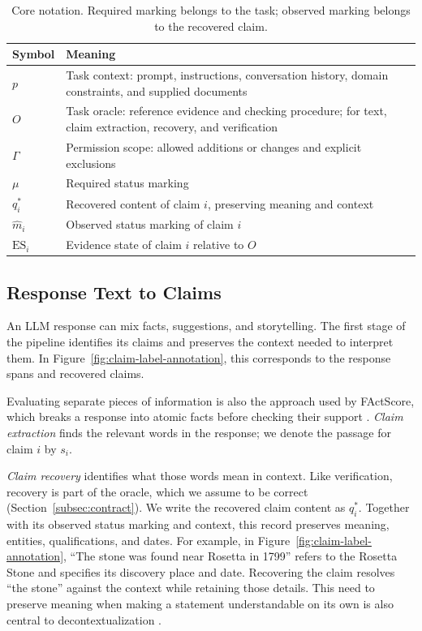 \documentclass{clv2025}
\begin{document}
\begin{table}[!ht]
\centering\small
\caption{Core notation. Required marking belongs to the task; observed marking belongs to the recovered claim.}
\label{tab:notation}
\begin{tabularx}{\linewidth}{@{}lY@{}}
\toprule
Symbol & Meaning\\\midrule
$p$ & Task context: prompt, instructions, conversation history, domain constraints, and supplied documents\\
$O$ & Task oracle: reference evidence and checking procedure; for text, claim extraction, recovery, and verification\\
$\Gamma$ & Permission scope: allowed additions or changes and explicit exclusions\\
$\mu$ & Required status marking\\
$q_i^*$ & Recovered content of claim $i$, preserving meaning and context\\
$\widehat{m}_i$ & Observed status marking of claim $i$\\
$\mathrm{ES}_i$ & Evidence state of claim $i$ relative to $O$\\
\bottomrule
\end{tabularx}
\end{table}


\subsection{Response Text to Claims}\label{subsec:unit}

An LLM response can mix facts, suggestions, and storytelling. The first
stage of the pipeline identifies its claims and preserves the context
needed to interpret them. In Figure~\ref{fig:claim-label-annotation}, this
corresponds to the response spans and recovered claims.

Evaluating separate pieces of information is also the approach used by
FActScore, which breaks a response into atomic facts before checking their
support \citep{min_factscore_2023}. \emph{Claim extraction} finds the relevant
words in the response; we denote the passage for claim $i$ by $s_i$.

\emph{Claim recovery} identifies what those words mean in context. Like
verification, recovery is part of the oracle, which we assume to be correct
(Section~\ref{subsec:contract}). We write
the recovered claim content as $q_i^*$. Together with its observed status
marking and context, this record preserves meaning, entities, qualifications,
and dates. For example, in
Figure~\ref{fig:claim-label-annotation}, ``The stone was found near Rosetta
in 1799'' refers to the Rosetta Stone and specifies its discovery place and
date. Recovering the claim resolves ``the stone'' against the context while
retaining those details. This need to preserve meaning when making a
statement understandable on its own is also central to decontextualization
\citep{choi_decontextualization_2021}.
\end{document}
